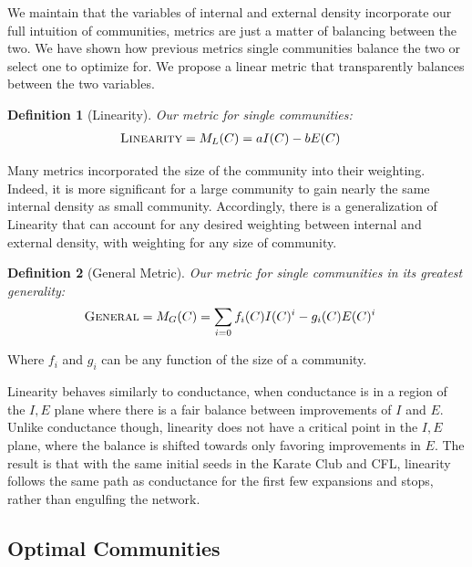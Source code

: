 \documentclass[conference]{IEEEtran}
\newtheorem{definition}{Definition}
\begin{document}
We maintain that the variables of internal and external density incorporate our full intuition of communities, metrics are just a matter of balancing between the two.  We have shown how previous metrics single communities balance the two or select one to optimize for.  We propose a linear metric that transparently balances between the two variables.
\begin{definition}[Linearity]
 Our metric for single communities:
  \begin{align}
   \text{\sc Linearity} = M_L(C) &= a I(C) - b E(C)
  \end{align}
\end{definition}
Many metrics incorporated the size of the community into their weighting.  Indeed, it is more significant for a large community to gain nearly the same internal density as small community.  Accordingly, there is a generalization of {\sc Linearity} that can account for any desired weighting between internal and external density, with weighting for any size of community.
\begin{definition}[General Metric]
 Our metric for single communities in its greatest generality:
  \begin{align}
   \text{\sc General} = M_G(C) &= \sum\limits_{i = 0} f_i(C) I(C)^i - g_i(C) E(C)^i
  \end{align}
\end{definition}
Where $f_i$ and $g_i$ can be any function of the size of a community.

Linearity behaves similarly to conductance, when conductance is in a region of the $I,E$ plane where there is a fair balance between improvements of $I$ and $E$.  Unlike conductance though, linearity does not have a critical point in the $I,E$ plane, where the balance is shifted towards only favoring improvements in $E$.  The result is that with the same initial seeds in the Karate Club and CFL, linearity follows the same path as conductance for the first few expansions and stops, rather than engulfing the network.

\subsection{Optimal Communities}
\end{document}
